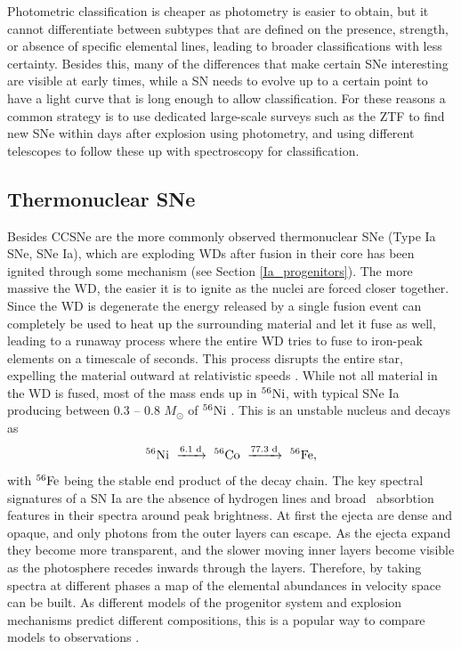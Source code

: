 \documentclass[a4paper,oneside,12pt, class=Latex/Classes/PhDthesisPSnPDF, crop=false]{standalone}
\begin{document}
Photometric classification is cheaper as photometry is easier to obtain, but it cannot differentiate between subtypes that are defined on the presence, strength, or absence of specific elemental lines, leading to broader classifications with less certainty. Besides this, many of the differences that make certain SNe interesting are visible at early times, while a SN needs to evolve up to a certain point to have a light curve that is long enough to allow classification. For these reasons a common strategy is to use dedicated large-scale surveys such as the ZTF to find new SNe within days after explosion using photometry, and using different telescopes to follow these up with spectroscopy for classification.

\subsection{Thermonuclear SNe}
\label{SNIa}
Besides CCSNe are the more commonly observed thermonuclear SNe (Type Ia SNe, SNe Ia), which are exploding WDs after fusion in their core has been ignited through some mechanism (see Section \ref{Ia_progenitors}). The more massive the WD, the easier it is to ignite as the nuclei are forced closer together. Since the WD is degenerate the energy released by a single fusion event can completely be used to heat up the surrounding material and let it fuse as well, leading to a runaway process where the entire WD tries to fuse to iron-peak elements on a timescale of seconds. This process disrupts the entire star, expelling the material outward at relativistic speeds \citep{Ia_thermonuclear}. While not all material in the WD is fused, most of the mass ends up in $^{56}\text{Ni}$, with typical SNe Ia producing between 0.3 -- 0.8 $M_\odot$ of $^{56}\text{Ni}$ \citep{Ia_Ni56_yield}. This is an unstable nucleus and decays as
\begin{equation}
    \Nififtysix\ \xrightarrow{6.1\text{ d}}\ \Cofiftysix\ \xrightarrow{77.3\text{ d}}\ \Fefiftysix,
\end{equation}
with $^{56}\text{Fe}$ being the stable end product of the decay chain. The key spectral signatures of a SN Ia are the absence of hydrogen lines and broad \SiII\ absorbtion features in their spectra around peak brightness. At first the ejecta are dense and opaque, and only photons from the outer layers can escape. As the ejecta expand they become more transparent, and the slower moving inner layers become visible as the photosphere recedes inwards through the layers. Therefore, by taking spectra at different phases a map of the elemental abundances in velocity space can be built. As different models of the progenitor system and explosion mechanisms predict different compositions, this is a popular way to compare models to observations \citep[e.g.][]{ptf11kx,de_2019_18byg,2020sck_Iax,2021rhu}.
\end{document}
